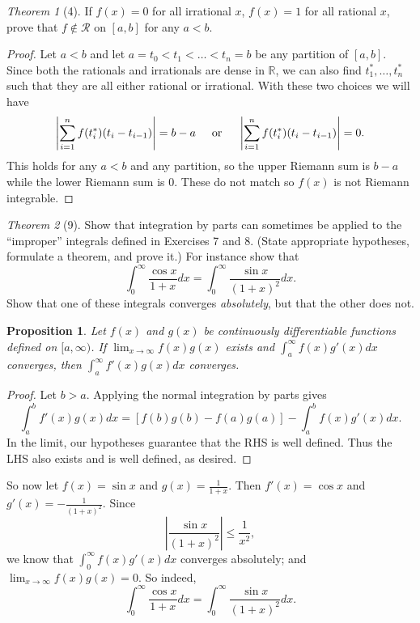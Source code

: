 \documentclass[12pt]{article}
\newtheorem*{prop}{Proposition}
\theoremstyle{remark}
\theoremstyle{named}
\newtheorem*{theorem}{Theorem}
\newcommand{\R}{\mathbb R}
\newcommand{\bigabs}[1]{\left|#1\right|}
\begin{document}
\begin{theorem}[4]
    If \(f(x) = 0\) for all irrational \(x\), \(f(x) = 1\) for all rational \(x\), prove that \(f \notin \mathcal R\) on \([a, b]\) for any \(a < b\).
\end{theorem}

\begin{proof}
    Let \(a < b\) and let \(a = t_0 < t_1 < \dots < t_n = b\) be any partition of \([a, b]\). Since both the rationals and irrationals are dense in \(\R\), we can also find \(t_1^*, \dots, t_n^*\) such that they are all either rational or irrational. With these two choices we will have 
    \[\bigabs{\sum_{i = 1}^n f(t_i^*)(t_i - t_{i - 1})} = b - a \hspace*{5mm} \text{or} \hspace*{5mm} \bigabs{\sum_{i = 1}^n f(t_i^*)(t_i - t_{i - 1})} = 0.\]
    This holds for any \(a < b\) and any partition, so the upper Riemann sum is \(b - a\) while the lower Riemann sum is \(0\). These do not match so \(f(x)\) is not Riemann integrable.
\end{proof}

\begin{theorem}[9]
    Show that integration by parts can sometimes be applied to the ``improper'' integrals defined in Exercises 7 and 8. (State appropriate hypotheses, formulate a theorem, and prove it.) For instance show that 
    \[\int_0^\infty \frac{\cos x}{1 + x}dx = \int_0^\infty \frac{\sin x}{(1 + x)^2}dx.\]
    Show that one of these integrals converges \textit{absolutely}, but that the other does not.
\end{theorem}

\begin{prop}
    Let \(f(x)\) and \(g(x)\) be continuously differentiable functions defined on \([a,  \infty)\). If \(\lim_{x \to \infty} f(x)g(x)\) exists and \(\int_a^\infty f(x)g'(x)dx\) converges, then \(\int_a^\infty f'(x)g(x)dx\) converges. 
\end{prop}

\begin{proof}
    Let \(b > a\). Applying the normal integration by parts gives 
    \[\int_a^b f'(x)g(x) dx = [f(b)g(b) - f(a)g(a)] - \int_a^b f(x)g'(x) dx.\]
    In the limit, our hypotheses guarantee that the RHS is well defined. Thus the LHS also exists and is well defined, as desired.
\end{proof}

So now let \(f(x) = \sin x\) and \(g(x) = \frac{1}{1 + x}\). Then \(f'(x) = \cos x\) and \(g'(x) = -\frac{1}{(1 + x)^2}\). Since \[\bigabs{\frac{\sin x}{(1 + x)^2}}\le \frac{1}{x^2},\]
we know that \(\int_0^\infty f(x)g'(x)dx\) converges absolutely; and \(\lim_{x \to \infty} f(x)g(x) = 0\). So indeed, 
\[\int_0^\infty \frac{\cos x}{1 + x}dx = \int_0^\infty \frac{\sin x}{(1 + x)^2}dx.\]
\end{document}
